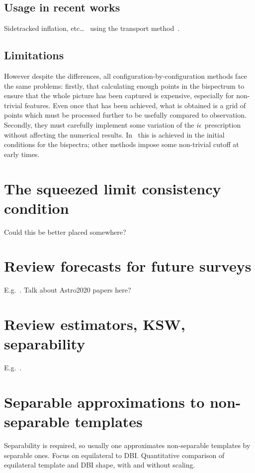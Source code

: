     \subsection{Usage in recent works}
    Sidetracked inflation, etc\ldots~\cite{Fumagalli_2019} using the transport method~\cite{transport_pytransport_2}.
    \subsection{Limitations}
    However despite the differences, all configuration-by-configuration methods face the same problems:
firstly, that calculating enough points in the bispectrum to ensure that
the whole picture has been captured is expensive, especially for non-trivial features.
Even once that has been achieved, what is obtained is a grid of points
which must be processed further to be usefully compared to observation.
Secondly, they must carefully implement some variation
of the $i\epsilon$ prescription without affecting the numerical results.
In~\cite{transport_main} this is achieved in the initial conditions for the bispectra;
other methods impose some non-trivial cutoff at early times.

    \newpage
    \section{The squeezed limit consistency condition}
    Could this be better placed somewhere?
\newpage
    \section{Review forecasts for future surveys}
    E.g.~\cite{Sohn_2019}. Talk about Astro2020 papers here?~\cite{astro2020_png, astro2020_features}
    \newpage
    \section{Review estimators, KSW, separability}
    E.g.~\cite{Smith_2011, Komatsu_2005}.
\newpage
    \section{Separable approximations to non-separable templates}
    Separability is required, so usually one approximates non-separable templates
    by separable ones.
\newpage
    Focus on equilateral to DBI.
    Quantitative comparison of equilateral template and DBI shape,
    with and without scaling.
\newpage
